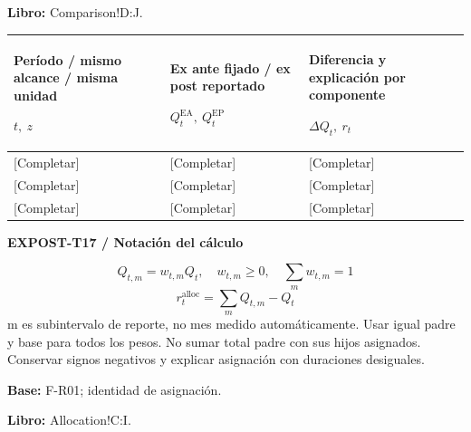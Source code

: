 \textbf{Libro:} Comparison!D:J.\par\endgroup
{\sffamily\fontsize{8.3}{10.3}\selectfont\begin{longtable}{@{}P{54.83mm} P{54.83mm} P{54.83mm}@{}}
\toprule
\textbf{Período / mismo alcance / misma unidad}\par {\normalfont\fontsize{8.2}{10}\selectfont $t,\ z$} & \textbf{Ex ante fijado / ex post reportado}\par {\normalfont\fontsize{8.2}{10}\selectfont $Q_t^{\mathrm{EA}},\ Q_t^{\mathrm{EP}}$} & \textbf{Diferencia y explicación por componente}\par {\normalfont\fontsize{8.2}{10}\selectfont $\Delta Q_t,\ r_t$}\\\midrule\endhead
\rule{0pt}{8mm}[Completar] & [Completar] & [Completar]\\\hline
\rule{0pt}{8mm}[Completar] & [Completar] & [Completar]\\\hline
\rule{0pt}{8mm}[Completar] & [Completar] & [Completar]\\\hline
\end{longtable}}
\par\begingroup\sffamily\fontsize{8}{10}\selectfont\color{NEBGreen}\setlength{\parskip}{2pt}\setlength{\abovedisplayskip}{4pt}\setlength{\belowdisplayskip}{4pt}\setlength{\abovedisplayshortskip}{2pt}\setlength{\belowdisplayshortskip}{3pt}
\textbf{EXPOST-T17 / Notación del cálculo}\par
{\fontsize{9}{11}\selectfont\[ Q_{t,m}=w_{t,m}Q_t,\quad w_{t,m}\ge0,\quad \sum_m w_{t,m}=1 \]}
{\fontsize{9}{11}\selectfont\[ r_t^{\mathrm{alloc}}=\sum_m Q_{t,m}-Q_t \]}
m es subintervalo de reporte, no mes medido automáticamente. Usar igual padre y base para todos los pesos. No sumar total padre con sus hijos asignados. Conservar signos negativos y explicar asignación con duraciones desiguales.\par
\textbf{Base:} F-R01; identidad de asignación.\par
\textbf{Libro:} Allocation!C:I.\par\endgroup
